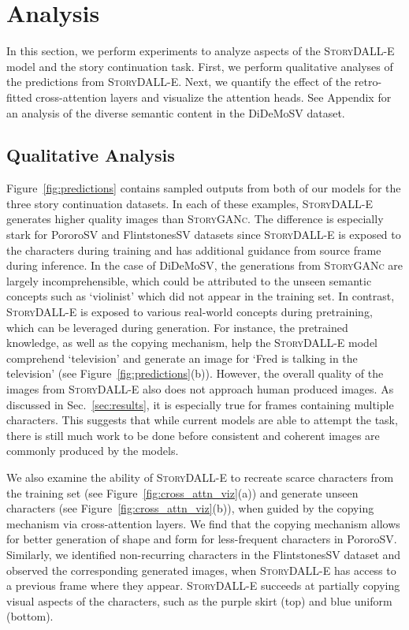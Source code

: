 \documentclass[runningheads]{llncs}
\newcommand{\sdalle}[1]{\textsc{StoryDALL-E}}
\newcommand{\sgan}[1]{\textsc{StoryGANc}}
\begin{document}
\section{Analysis}
In this section, we perform experiments to analyze aspects of the \sdalle{} model and the story continuation task. First, we perform qualitative analyses of the predictions from \sdalle{}. Next, we quantify the effect of the retro-fitted cross-attention layers and visualize the attention heads. See Appendix for an analysis of the diverse semantic content in the DiDeMoSV dataset. 

\subsection{Qualitative Analysis}
\label{sec:qual_analysis}

Figure~\ref{fig:predictions} contains sampled outputs from both of our models for the three story continuation datasets. In each of these examples, \sdalle{} generates higher quality images than \sgan{}. The difference is especially stark for PororoSV and FlintstonesSV datasets since \sdalle{} is exposed to the characters during training and has additional guidance from source frame during inference. In the case of DiDeMoSV, the generations from \sgan{} are largely incomprehensible, which could be attributed to the unseen semantic concepts such as `violinist' which did not appear in the training set. In contrast, \sdalle{} is exposed to various real-world concepts during pretraining, which can be leveraged during generation. For instance, the pretrained knowledge, as well as the copying mechanism, help the \sdalle{} model comprehend `television' and generate an image for `Fred is talking in the television' (see Figure~\ref{fig:predictions}(b)). However, the overall quality of the images from \sdalle{} also does not approach human produced images. As discussed in Sec.~\ref{sec:results}, it is especially true for frames containing multiple characters. This suggests that while current models are able to attempt the task, there is still much work to be done before consistent and coherent images are commonly produced by the models.

We also examine the ability of \sdalle{} to recreate scarce characters from the training set (see Figure~\ref{fig:cross_attn_viz}(a)) and generate unseen characters (see Figure~\ref{fig:cross_attn_viz}(b)), when guided by the copying mechanism via cross-attention layers. We find that the copying mechanism allows for better generation of shape and form for less-frequent characters in PororoSV. Similarly, we identified non-recurring characters in the FlintstonesSV dataset and observed the corresponding generated images, when \sdalle{} has access to a previous frame where they appear. \sdalle{} succeeds at partially copying visual aspects of the characters, such as the purple skirt (top) and blue uniform (bottom).
\end{document}
